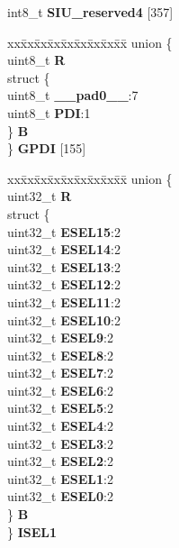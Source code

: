 \begin{DoxyCompactItemize}
\begin{tabbing}
\end{tabbing}\item 
\mbox{\label{structSIU__tag_afdc559690c5075399f6b87541e17cbfb}} 
int8\+\_\+t {\bfseries S\+I\+U\+\_\+reserved4} \mbox{[}357\mbox{]}
\item 
\mbox{\label{structSIU__tag_ae04dde380c1beb373d6609751f815f61}} 
\begin{tabbing}
xx\=xx\=xx\=xx\=xx\=xx\=xx\=xx\=xx\=\kill
union \{\\
\>uint8\_t {\bfseries R}\\
\>struct \{\\
\>\>uint8\_t {\bfseries \_\_pad0\_\_}:7\\
\>\>uint8\_t {\bfseries PDI}:1\\
\>\} {\bfseries B}\\
\} {\bfseries GPDI} \mbox{[}155\mbox{]}\\

\end{tabbing}\item 
\mbox{\label{structSIU__tag_a00a36d13b55620740cbee947bf7eaab9}} 
\begin{tabbing}
xx\=xx\=xx\=xx\=xx\=xx\=xx\=xx\=xx\=\kill
union \{\\
\>uint32\_t {\bfseries R}\\
\>struct \{\\
\>\>uint32\_t {\bfseries ESEL15}:2\\
\>\>uint32\_t {\bfseries ESEL14}:2\\
\>\>uint32\_t {\bfseries ESEL13}:2\\
\>\>uint32\_t {\bfseries ESEL12}:2\\
\>\>uint32\_t {\bfseries ESEL11}:2\\
\>\>uint32\_t {\bfseries ESEL10}:2\\
\>\>uint32\_t {\bfseries ESEL9}:2\\
\>\>uint32\_t {\bfseries ESEL8}:2\\
\>\>uint32\_t {\bfseries ESEL7}:2\\
\>\>uint32\_t {\bfseries ESEL6}:2\\
\>\>uint32\_t {\bfseries ESEL5}:2\\
\>\>uint32\_t {\bfseries ESEL4}:2\\
\>\>uint32\_t {\bfseries ESEL3}:2\\
\>\>uint32\_t {\bfseries ESEL2}:2\\
\>\>uint32\_t {\bfseries ESEL1}:2\\
\>\>uint32\_t {\bfseries ESEL0}:2\\
\>\} {\bfseries B}\\
\} {\bfseries ISEL1}\\


\end{tabbing}
\end{DoxyCompactItemize}
